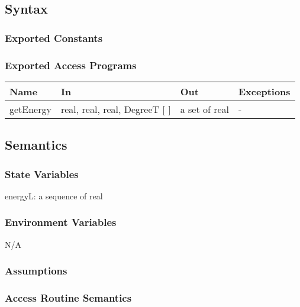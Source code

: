 \documentclass[12pt, titlepage]{article}
\begin{document}
\subsection{Syntax}

\subsubsection{Exported Constants}


\subsubsection{Exported Access Programs}

\begin{center}
\begin{tabular}{p{2cm} p{5cm} p{4cm} p{1cm}}
\hline
\textbf{Name} & \textbf{In} & \textbf{Out} & \textbf{Exceptions} \\
\hline 
getEnergy & real, real, real, DegreeT [ ] & a set of real & - \\


\hline
\end{tabular}
\end{center}


\subsection{Semantics}

\subsubsection{State Variables}

energyL: a sequence of real\\

\subsubsection{Environment Variables}

N/A

\subsubsection{Assumptions}



\subsubsection{ Access Routine Semantics}
\end{document}
